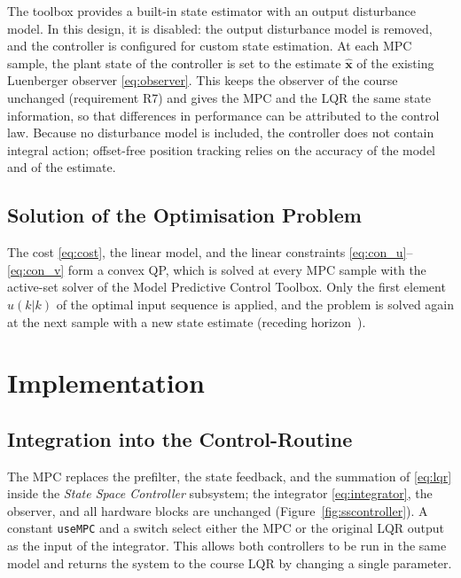 The toolbox provides a built-in state estimator with an output disturbance
model. In this design, it is disabled: the output disturbance model is
removed, and the controller is configured for custom state estimation. At each
\ac{MPC} sample, the plant state of the controller is set to the estimate
$\hat{\mathbf{x}}$ of the existing Luenberger observer \eqref{eq:observer}.
This keeps the observer of the course unchanged (requirement R7) and gives the
\ac{MPC} and the \ac{LQR} the same state information, so that differences in
performance can be attributed to the control law. Because no disturbance model
is included, the controller does not contain integral action; offset-free
position tracking relies on the accuracy of the model and of the estimate.

\subsection{Solution of the Optimisation Problem}
\label{subsec:qp}

The cost \eqref{eq:cost}, the linear model, and the linear constraints
\eqref{eq:con_u}--\eqref{eq:con_v} form a convex \ac{QP}, which is solved at
every \ac{MPC} sample with the active-set solver of the Model Predictive
Control Toolbox. Only the first element $u(k|k)$ of the optimal input sequence
is applied, and the problem is solved again at the next sample with a new
state estimate (receding horizon~\cite{rawlings2000}).

\section{Implementation}
\label{sec:implementation}

\subsection{Integration into the Control-Routine}
\label{subsec:integration}

The \ac{MPC} replaces the prefilter, the state feedback, and the summation of
\eqref{eq:lqr} inside the \emph{State Space Controller} subsystem; the
integrator \eqref{eq:integrator}, the observer, and all hardware blocks are
unchanged (Figure~\ref{fig:sscontroller}). A constant \texttt{useMPC} and a
switch select either the \ac{MPC} or the original \ac{LQR} output as the
input of the integrator. This allows both controllers to be run in the same
model and returns the system to the course \ac{LQR} by changing a single
parameter.


